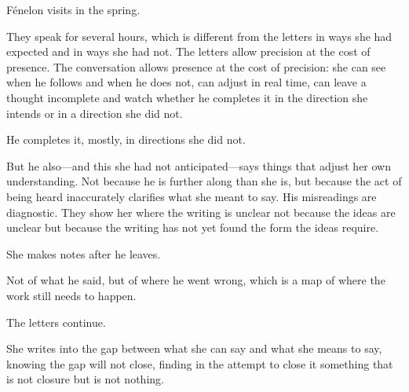Fénelon visits in the spring.

They speak for several hours, which is different from
the letters in ways she had expected and in ways she
had not. The letters allow precision at the cost of
presence. The conversation allows presence at the cost
of precision: she can see when he follows and when he
does not, can adjust in real time, can leave a thought
incomplete and watch whether he completes it in the
direction she intends or in a direction she did not.

He completes it, mostly, in directions she did not.

But he also---and this she had not anticipated---says
things that adjust her own understanding. Not because
he is further along than she is, but because the act
of being heard inaccurately clarifies what she meant
to say. His misreadings are diagnostic. They show her
where the writing is unclear not because the ideas
are unclear but because the writing has not yet found
the form the ideas require.

She makes notes after he leaves.

Not of what he said, but of where he went wrong, which
is a map of where the work still needs to happen.

The letters continue.

She writes into the gap between what she can say and
what she means to say, knowing the gap will not close,
finding in the attempt to close it something that is
not closure but is not nothing.

